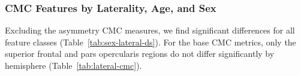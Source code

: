 \documentclass{article}
\newcommand{\CMC}{\(\text{CMC}\) }
\begin{document}


\subsubsection{CMC Features by Laterality, Age, and Sex}

Excluding the asymmetry CMC measures, we find significant differences for all
feature classes (Table~\ref{tab:sex-lateral-ds}).  For the base \CMC metrics,
only the superior frontal and pars opercularis regions  do not differ
significantly by hemisphere (Table~\ref{tab:lateral-cmc}).
\end{document}
